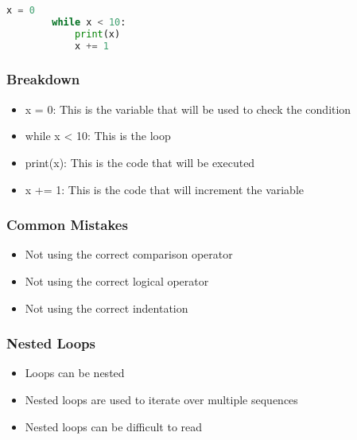 \documentclass[serif, 9pt, aspectratio=32]{beamer}
\begin{document}
\begin{frame}[fragile]
    \begin{lstlisting}[language=Python]
        x = 0
        while x < 10:
            print(x)
            x += 1
    \end{lstlisting}
\end{frame}

\begin{frame}
    \centering
    \frametitle{Breakdown}
    \begin{itemize}
        \setlength{\itemsep}{3em}
        \item x = 0: This is the variable that will be used to check the condition
        \item while x < 10: This is the loop
        \item print(x): This is the code that will be executed
        \item x += 1: This is the code that will increment the variable
    \end{itemize}
\end{frame}

\begin{frame}
    \centering
    \frametitle{Common Mistakes}
    \begin{itemize}
        \setlength{\itemsep}{3em}
        \item Not using the correct comparison operator
        \item Not using the correct logical operator
        \item Not using the correct indentation
    \end{itemize}
\end{frame}

\begin{frame}
    \centering
    \frametitle{Nested Loops}
    \begin{itemize}
        \setlength{\itemsep}{3em}
        \item Loops can be nested
        \item Nested loops are used to iterate over multiple sequences
        \item Nested loops can be difficult to read
    \end{itemize}
\end{frame}
\end{document}
